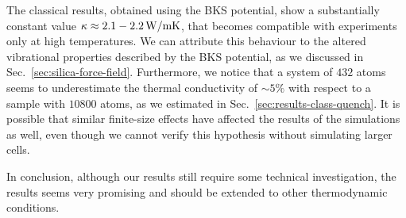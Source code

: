 The classical results, obtained using the BKS potential, show a substantially constant value $\kappa\approx 2.1-2.2\,\mathrm{W/mK}$, that becomes compatible with experiments only at high temperatures. 
We can attribute this behaviour to the altered vibrational properties described by the BKS potential, as we discussed in Sec.~\ref{sec:silica-force-field}. 
Furthermore, we notice that a system of $432$ atoms seems to underestimate the thermal conductivity of $\sim 5\%$ with respect to a sample with $10800$ atoms, as we estimated in Sec.~\ref{sec:results-class-quench}. 
It is possible that similar finite-size effects have affected the results of the \abinitio simulations as well, even though we cannot verify this hypothesis without simulating larger cells. 

In conclusion, although our \abinitio results still require some technical investigation, the results seems very promising and should be extended to other thermodynamic conditions. 








